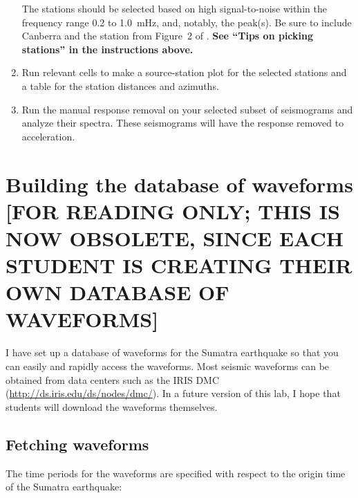\documentclass[11pt,titlepage,fleqn]{article}
\begin{document}
\begin{enumerate}
%
%
The stations should be selected based on high signal-to-noise within the frequency range 0.2 to 1.0~mHz, and, notably, the  peak(s). Be sure to include Canberra and the station from Figure~2 of \citet{Park2005}.
{\bf See ``Tips on picking stations'' in the instructions above.}

\item Run relevant cells to make a source-station plot for the selected stations and a table for the station distances and azimuths.

\item Run the manual response removal on your selected subset of seismograms and analyze their spectra.
These seismograms will have the response removed to acceleration.

\end{enumerate}


\iffalse

\section{Building the database of waveforms [FOR READING ONLY; THIS IS NOW OBSOLETE, SINCE EACH STUDENT IS CREATING THEIR OWN DATABASE OF WAVEFORMS]}

I have set up a database of waveforms for the Sumatra earthquake so that you can easily and rapidly access the waveforms. Most seismic waveforms can be obtained from data centers such as the IRIS DMC (\url{http://ds.iris.edu/ds/nodes/dmc/}). In a future version of this lab, I hope that students will download the waveforms themselves.

\subsection{Fetching waveforms}

\medskip\noindent
The time periods for the waveforms are specified with respect to the origin time of the Sumatra earthquake:
\end{document}
